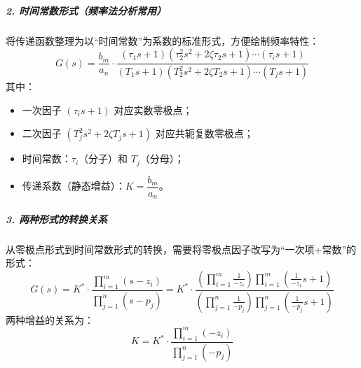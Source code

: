 \subparagraph{2. 时间常数形式（频率法分析常用）}
将传递函数整理为以“时间常数”为系数的标准形式，方便绘制频率特性：
\[
G(s) = \frac{b_m}{a_n} \cdot \frac{(\tau_1 s+1)(\tau_2^2 s^2 + 2\zeta\tau_2 s + 1)\cdots(\tau_i s+1)}{(T_1 s+1)(T_2^2 s^2 + 2\zeta T_2 s + 1)\cdots(T_j s+1)}
\]
其中：
\begin{itemize}
    \item 一次因子 $(\tau_i s+1)$ 对应实数零极点；
    \item 二次因子 $(T_j^2 s^2 + 2\zeta T_j s + 1)$ 对应共轭复数零极点；
    \item 时间常数：$\tau_i$（分子）和 $T_j$（分母）；
    \item 传递系数（静态增益）：$K = \dfrac{b_m}{a_n}$。
\end{itemize}

\subparagraph{3. 两种形式的转换关系}
从零极点形式到时间常数形式的转换，需要将零极点因子改写为“一次项+常数”的形式：
\[
G(s) = K^* \cdot \frac{\prod_{i=1}^m (s-z_i)}{\prod_{j=1}^n (s-p_j)} = K^* \cdot \frac{\left( \prod_{i=1}^m \frac{1}{-z_i} \right) \prod_{i=1}^m \left( \frac{1}{-z_i} s + 1 \right)}{\left( \prod_{j=1}^n \frac{1}{-p_j} \right) \prod_{j=1}^n \left( \frac{1}{-p_j} s + 1 \right)}
\]
两种增益的关系为：
\[
K = K^* \cdot \frac{\prod_{i=1}^m (-z_i)}{\prod_{j=1}^n (-p_j)}
\]


